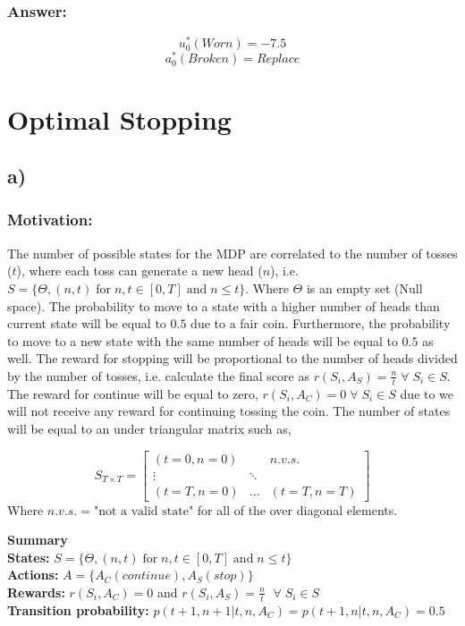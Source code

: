 \documentclass{article}
\begin{document}
\subsubsection*{Answer:}
$$u^*_0(Worn)= -7.5$$
$$a^*_0(Broken)=Replace$$


\section{Optimal Stopping}
\subsection*{a)}
\subsubsection*{Motivation:}
The number of possible states for the MDP are correlated to the number of tosses ($t$), where each toss can generate a new head ($n$), i.e. $S = \{\Theta ,(n, t) \; \text{for} \; n,t\in [0,T] \; \text{and} \; n\leq t\}$. Where $\Theta$ is an empty set (Null space). The probability to move to a state with a higher number of heads than current state will be equal to $0.5$ due to a fair coin. Furthermore, the probability to move to a new state with the same number of heads will be equal to $0.5$ as well. The reward for stopping will be proportional to the number of heads divided by the number of tosses, i.e. calculate the final score as $r(S_i, A_S) = \frac{n}{t} \; \forall \; S_i \in S$. The reward for continue will be equal to zero, $r(S_i, A_C) = 0 \; \forall \; S_i \in S $ due to we will not receive any reward for continuing tossing the coin. The number of states will be equal to an under triangular matrix such as, 

\[
S_{T\times T} = \begin{bmatrix} 
    (t=0, n=0) &  & n.v.s. \\
    \vdots & \ddots & \\
    (t=T, n=0) & \dots& (t=T, n=T) 
    \end{bmatrix}
\]
Where  $n.v.s. =\text{"not a valid state"}$ for all of the over diagonal elements.

\textbf{Summary}\\
\textbf{States:} $S = \{\Theta ,(n, t) \; \text{for} \; n,t\in [0,T] \; \text{and} \; n\leq t\}$\\
\textbf{Actions:} $A = \{A_C(continue), A_S(stop)\}$ \\
\textbf{Rewards:}  $r(S_i, A_C) = 0$ and $r(S_i, A_S) = \frac{n}{t}$ $ \; \forall \; S_i \in S$  \\
\textbf{Transition probability:} $p(t+1, n+1|t, n, A_C)=p(t+1, n|t, n, A_C)=0.5$
\end{document}
